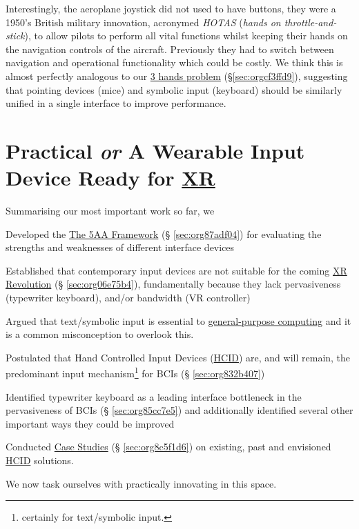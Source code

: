 \documentclass[logo,bsc,singlespacing,parskip]{infthesis}
\begin{document}
Interestingly, the aeroplane joystick did not used to have buttons, they were a 1950's British military innovation, acronymed \emph{HOTAS} (\emph{hands on throttle-and-stick}), to allow pilots to perform all vital functions whilst keeping their hands on the navigation controls of the aircraft.
Previously they had to switch between navigation and operational functionality which could be costly.
We think this is almost perfectly analogous to our \hyperref[sec:orgcf3ffd9]{3 hands problem} (\S \ref{sec:orgcf3ffd9}), suggesting that pointing devices (mice) and symbolic input (keyboard) should be similarly unified in a single interface to improve performance.

\part{Practical \emph{or} A Wearable Input Device Ready for \hyperref[org88b0f70]{XR}}
\label{sec:orgf66b89e}
Summarising our most important work so far, we
\begin{enumerate*}[label={\arabic*)}, itemjoin={, \,}, itemjoin*={, and \,}]
\item Developed the \hyperref[sec:org87adf04]{The 5AA Framework} (§ \ref{sec:org87adf04}) for evaluating the strengths and weaknesses of different interface devices
\item Established that contemporary input devices are not suitable for the coming \hyperref[sec:org06e75b4]{XR Revolution} (§ \ref{sec:org06e75b4}), fundamentally because they lack pervasiveness (typewriter keyboard), and/or bandwidth (VR controller)
\item Argued that text/symbolic input is essential to \hyperref[orgc53ce01]{general-purpose computing} and it is a common misconception to overlook this.
\item Postulated that Hand Controlled Input Devices (\hyperref[orgf95a76e]{HCID}) are, and will remain, the predominant input mechanism\footnote{certainly for text/symbolic input.} for BCIs (§ \ref{sec:org832b407})
\item Identified typewriter keyboard as a leading interface bottleneck in the pervasiveness of BCIs (§ \ref{sec:org85cc7e5}) and additionally identified several other important ways they could be improved
\item Conducted \hyperref[sec:org8c5f1d6]{Case Studies} (§ \ref{sec:org8c5f1d6}) on existing, past and envisioned \hyperref[orgf95a76e]{HCID} solutions.
\end{enumerate*}
We now task ourselves with practically innovating in this space. \medskip
\end{document}
